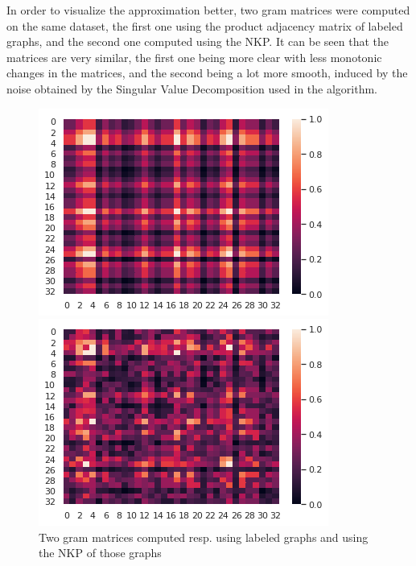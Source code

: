 \documentclass{article}
\theoremstyle{definition}
\begin{document}
In order to visualize the approximation better, two gram matrices were computed on the same dataset, the first one using the product adjacency matrix of labeled graphs, and the second one computed using the NKP. It can be seen that the matrices are very similar, the first one being more clear with less monotonic changes in the matrices, and the second being a lot more smooth, induced by the noise obtained by the Singular Value Decomposition used in the algorithm.
\begin{figure}[!htb]
	\begin{multicols}{2}
		\includegraphics[width=\linewidth]{data/nkp/gram.png}\par
		\includegraphics[width=\linewidth]{data/nkp/gram_approx.png}\par
	\end{multicols}
\caption{Two gram matrices computed resp. using labeled graphs and using the NKP of those graphs}
\end{figure}
\end{document}
